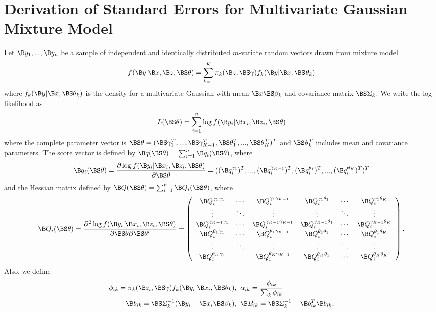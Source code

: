 \chapter{Derivation of Standard Errors for Multivariate Gaussian Mixture Model}

Let $\B y_{1},...,\B y_{n}$ be a sample of independent and identically distributed  $m$-variate random vectors drawn from mixture model
$$f(\B y|\B x, \B z, \BS\theta) = \sum^{K}_{k=1}\pi_{k}(\B z, \BS\gamma)f_{k}(\B y|\B x, \BS \theta_{k})$$
where $f_{k}(\B y|\B x, \BS \theta_{k})$ is the density for a multivariate Gaussian with mean $\B x\BS\beta_{k}$ and covariance matrix $\BS\Sigma_{k}$. We write the log likelihood as
$$L(\BS\theta)=\sum^{n}_{i=1}\log f(\B y_{i}|\B x_{i},\B z_{i},\BS\theta)$$
where the complete parameter vector is $\BS\theta=(\BS\gamma_{1}^{T},...,\BS\gamma_{K-1}^{T},\BS\theta^{T}_{1},...,\BS\theta^{T}_{K})^{T}$ and $\BS\theta_{k}^{T}$ includes mean and covariance parameters. The score vector is defined by $\B q(\BS\theta)=\sum_{i=1}^{n}\B q_{i}(\BS \theta)$, where
$$\B q_{i}(\BS\theta)=\frac{\partial \log f(\B y_{i}|\B x_{i},\B z_{i},\BS\theta)}{\partial \BS\theta}=((\B q^{\gamma_{1}}_{i})^{T},...,(\B q^{\gamma_{K-1}}_{i})^{T},(\B q^{\theta_{1}}_{i})^{T},...,(\B q^{\theta_{K}}_{i})^{T})^{T}$$
and the Hessian matrix defined by $\B Q(\BS\theta)=\sum_{i=1}^{n}\B Q_{i}(\BS\theta)$, where
$$ \B Q_{i}(\BS\theta)=\frac{\partial^{2} \log f(\B y_{i}|\B x_{i},\B z_{i},\BS\theta)}{\partial \BS\theta\partial \BS\theta'}=\left(\begin{array}{cccccc} \B Q^{\gamma_{1}\gamma_{1}}_{i}&\cdots&\B Q^{\gamma_{1}\gamma_{K-1}}_{i}&\B Q^{\gamma_{1}\theta_{1}}_{i}&\cdots&\B Q^{\gamma_{1}\theta_{K}}_{i}\\
\vdots&\ddots&\vdots&\vdots&\ddots&\vdots\\
\B Q^{\gamma_{K-1}\gamma_{1}}_{i}&\cdots&\B Q^{\gamma_{K-1}\gamma_{K-1}}_{i}&\B Q^{\gamma_{K-1}\theta_{1}}_{i}&\cdots&\B Q^{\gamma_{K-1}\theta_{K}}_{i}\\
\B Q^{\theta_{1}\gamma_{1}}_{i}&\cdots&\B Q^{\theta_{1}\gamma_{K-1}}_{i}&\B Q^{\theta_{1}\theta_{1}}_{i}&\cdots&\B Q^{\theta_{1}\theta_{K}}_{i}\\
\vdots&\ddots&\vdots&\vdots&\ddots&\vdots\\
\B Q^{\theta_{K}\gamma_{1}}_{i}&\cdots&\B Q^{\theta_{K}\gamma_{K-1}}_{i}&\B Q^{\theta_{K}\theta_{1}}_{i}&\cdots&\B Q^{\theta_{K}\theta_{K}}_{i}\\
\end{array} \right).$$
Also, we define
\begin{align}
\phi_{ik}=\pi_{k}(\B z_{i},\BS\gamma)f_{k}(\B y_{i}|\B x_{i},\BS\theta_{k}),&\;\; \alpha_{ik}=\frac{\phi_{ik}}{\sum_{k}\phi_{ik}}\label{phi}\\
\B b_{ik}=\BS\Sigma_{k}^{-1}(\B y_{i}-\B x_{i}\BS\beta_{k}),&\;\; \B B_{ik}=\BS\Sigma_{k}^{-1}-\B b^{T}_{ik}\B b_{ik},\label{bs2}
\end{align}

